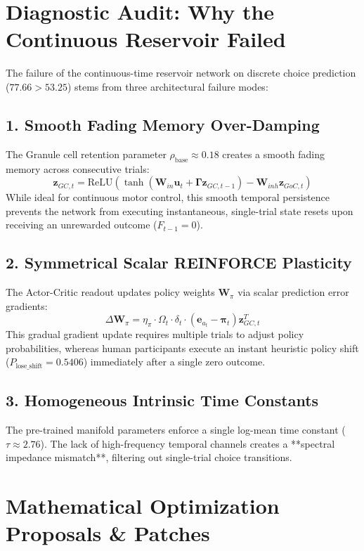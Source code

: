 \documentclass[11pt,a4paper]{article}
\begin{document}
\section{Diagnostic Audit: Why the Continuous Reservoir Failed}

The failure of the continuous-time reservoir network on discrete choice prediction ($77.66 > 53.25$) stems from three architectural failure modes:

\subsection{1. Smooth Fading Memory Over-Damping}
The Granule cell retention parameter $\rho_{\text{base}} \approx 0.18$ creates a smooth fading memory across consecutive trials:
$$\mathbf{z}_{GC,t} = \text{ReLU}\left( \tanh(\mathbf{W}_{in}\mathbf{u}_t + \boldsymbol{\Gamma}\mathbf{z}_{GC,t-1}) - \mathbf{W}_{inh}\mathbf{z}_{GoC,t} \right)$$
While ideal for continuous motor control, this smooth temporal persistence prevents the network from executing instantaneous, single-trial state resets upon receiving an unrewarded outcome ($F_{t-1} = 0$).

\subsection{2. Symmetrical Scalar REINFORCE Plasticity}
The Actor-Critic readout updates policy weights $\mathbf{W}_\pi$ via scalar prediction error gradients:
$$\Delta \mathbf{W}_\pi = \eta_{\pi} \cdot \Omega_t \cdot \delta_t \cdot (\mathbf{e}_{a_t} - \boldsymbol{\pi}_t) \mathbf{z}_{GC,t}^T$$
This gradual gradient update requires multiple trials to adjust policy probabilities, whereas human participants execute an instant heuristic policy shift ($P_{\text{lose\_shift}} = 0.5406$) immediately after a single zero outcome.

\subsection{3. Homogeneous Intrinsic Time Constants}
The pre-trained manifold parameters enforce a single log-mean time constant ($\tau \approx 2.76$). The lack of high-frequency temporal channels creates a **spectral impedance mismatch**, filtering out single-trial choice transitions.

\section{Mathematical Optimization Proposals \& Patches}
\end{document}
